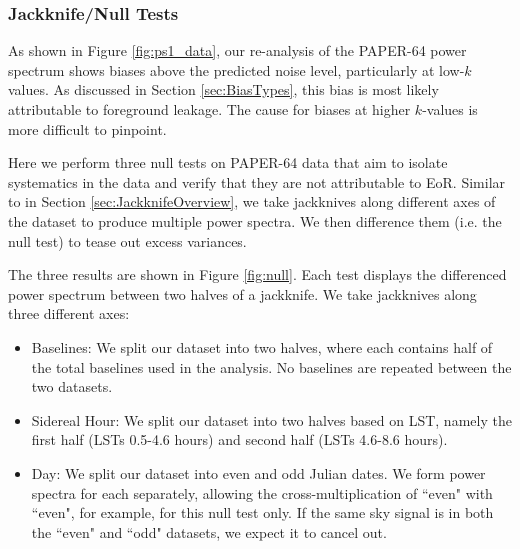\documentclass[preprint2,numberedappendix,tighten]{aastex6}
\begin{document}
\subsubsection{Jackknife/Null Tests}

As shown in Figure \ref{fig:ps1_data}, our re-analysis of the PAPER-64 power spectrum shows biases above the predicted noise level, particularly at low-$k$ values. As discussed in Section \ref{sec:BiasTypes}, this bias is
most likely attributable to foreground leakage. The cause for biases at higher $k$-values is more difficult to pinpoint. 

Here we perform three null tests on PAPER-64 data that aim to isolate systematics in the data and verify 
that they are not attributable to EoR. Similar to in Section \ref{sec:JackknifeOverview}, we take jackknives along different axes of the dataset to produce multiple power spectra. We then difference them (i.e. the null test) to tease out excess variances.

The three results are shown in Figure \ref{fig:null}. Each test displays the differenced power spectrum between two halves of a jackknife. We take jackknives along three different axes:

\begin{itemize}
\item Baselines: We split our dataset into two halves, where each contains half of the total baselines used in the 
analysis. No baselines are repeated between the two datasets.
\item Sidereal Hour: We split our dataset into two halves based on LST, namely the first half (LSTs 0.5-4.6 hours) and second half (LSTs 
4.6-8.6 hours).
\item Day: We split our dataset into even and odd Julian dates. We form power spectra for each separately, allowing the cross-multiplication of ``even" with ``even", for example, for this null test only. If the same sky signal is in both the ``even" and ``odd" datasets, we expect it to cancel out. %
\end{itemize}
\end{document}
